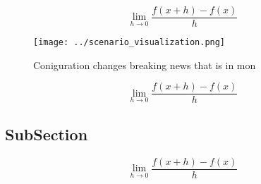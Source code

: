 \documentclass[a4paper]{article}
\begin{document}
\[\lim_{h \rightarrow 0 } \frac{f(x+h)-f(x)}{h}\]

\begin{figure}
\centering
\texttt{[image: ../scenario\_visualization.png]}
\caption{Coniguration changes breaking news that is in mon
}
\end{figure}
 
\[\lim_{h \rightarrow 0 } \frac{f(x+h)-f(x)}{h}\]

\subsection{SubSection}

\[\lim_{h \rightarrow 0 } \frac{f(x+h)-f(x)}{h}\]
\end{document}

